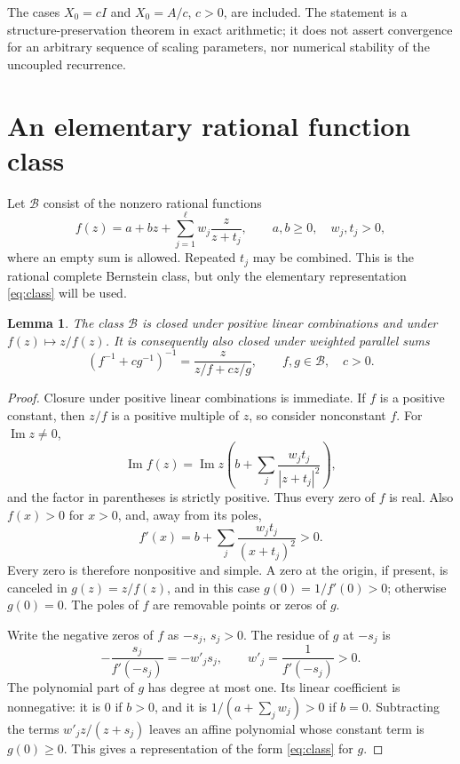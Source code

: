 \documentclass[11pt]{article}
\newtheorem{lemma}[theorem]{Lemma}
\begin{document}
The cases $X_0=cI$ and $X_0=A/c$, $c>0$, are included. The statement is a structure-preservation theorem in exact arithmetic; it does not assert convergence for an arbitrary sequence of scaling parameters, nor numerical stability of the uncoupled recurrence.

\section{An elementary rational function class}
Let $\mathcal B$ consist of the nonzero rational functions
\begin{equation}\label{eq:class}
f(z)=a+bz+\sum_{j=1}^{\ell}w_j\frac{z}{z+t_j},
\qquad a,b\ge0,\quad w_j,t_j>0,
\end{equation}
where an empty sum is allowed. Repeated $t_j$ may be combined. This is the rational complete Bernstein class, but only the elementary representation \eqref{eq:class} will be used.

\begin{lemma}\label{lem:closure}
The class $\mathcal B$ is closed under positive linear combinations and under $f(z)\mapsto z/f(z)$. It is consequently also closed under weighted parallel sums
\[
(f^{-1}+c g^{-1})^{-1}=\frac{z}{z/f+c z/g},\qquad f,g\in\mathcal B,\quad c>0.
\]
\end{lemma}
\begin{proof}
Closure under positive linear combinations is immediate. If $f$ is a positive constant, then $z/f$ is a positive multiple of $z$, so consider nonconstant $f$. For $\operatorname{Im}z\ne0$,
\[
\operatorname{Im} f(z)=\operatorname{Im}z\left(b+\sum_j\frac{w_jt_j}{|z+t_j|^2}\right),
\]
and the factor in parentheses is strictly positive. Thus every zero of $f$ is real. Also $f(x)>0$ for $x>0$, and, away from its poles,
\[
f'(x)=b+\sum_j\frac{w_jt_j}{(x+t_j)^2}>0.
\]
Every zero is therefore nonpositive and simple. A zero at the origin, if present, is canceled in $g(z)=z/f(z)$, and in this case $g(0)=1/f'(0)>0$; otherwise $g(0)=0$. The poles of $f$ are removable points or zeros of $g$.

Write the negative zeros of $f$ as $-s_j$, $s_j>0$. The residue of $g$ at $-s_j$ is
\[
-\frac{s_j}{f'(-s_j)}=-w'_j s_j,\qquad w'_j=\frac1{f'(-s_j)}>0.
\]
The polynomial part of $g$ has degree at most one. Its linear coefficient is nonnegative: it is $0$ if $b>0$, and it is $1/(a+\sum_j w_j)>0$ if $b=0$. Subtracting the terms $w'_jz/(z+s_j)$ leaves an affine polynomial whose constant term is $g(0)\ge0$. This gives a representation of the form \eqref{eq:class} for $g$.
\end{proof}
\end{document}
